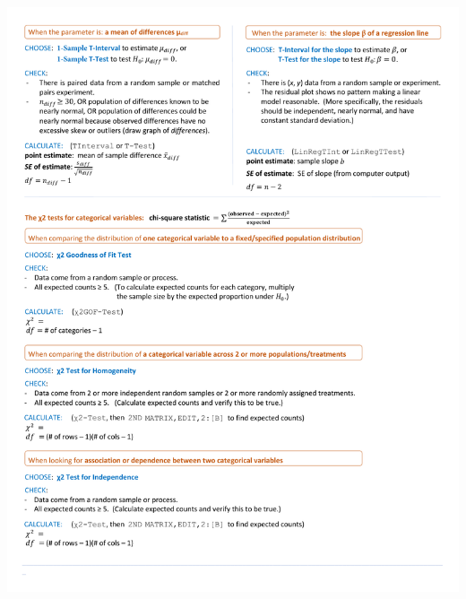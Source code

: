 \label{inferenceGuide}

\begin{center}\ \\[8mm]
\includegraphics[height=9.3in]{extraTeX/inferenceGuide/figures/inference_guide2}
\end{center}
\restoregeometry
